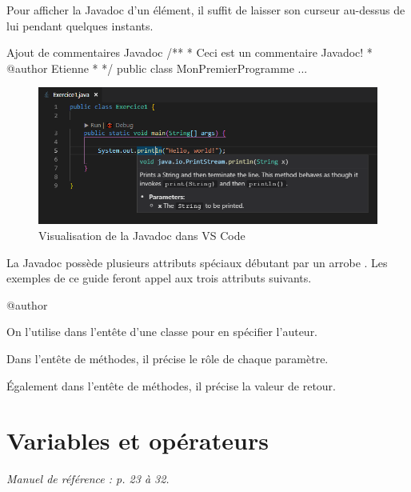 \documentclass[12pt]{report}
\newcommand{\commande}[1]{%
\tcbox[on line, size=fbox, colframe=black, boxrule=0.75pt, tcbox raise base]{#1} %
}
\begin{document}
Pour afficher la Javadoc d'un élément, il suffit de laisser son curseur au-dessus de lui pendant quelques instants.
%
%
\begin{MyTCB}{Ajout de commentaires Javadoc}
/**
 * Ceci est un commentaire Javadoc!
 * @author Etienne
 *
 */
public class MonPremierProgramme { ... }
\end{MyTCB}
%
%
\begin{figure}[!ht]
	\centering
	\includegraphics[scale=1]{vs-code-javadoc.png}
	\caption{Visualisation de la Javadoc dans VS Code}
\end{figure}
%
%
La Javadoc possède plusieurs attributs spéciaux débutant par un arrobe \commande{@}. Les exemples de ce guide feront appel aux trois attributs suivants.

\begin{labeling}{@author\ }

\item[\textbf{@author}] On l'utilise dans l'entête d'une classe pour en spécifier l'auteur.
\item[\textbf{@param}] Dans l'entête de méthodes, il précise le rôle de chaque paramètre.
\item[\textbf{@return}] Également dans l'entête de méthodes, il précise la valeur de retour.

\end{labeling}
%





%
%
%
%
\chapter{Variables et opérateurs}

\textit{Manuel de référence : p. 23 à 32.}

%
\end{document}
